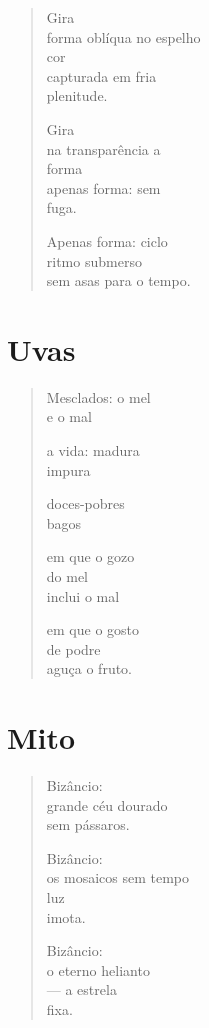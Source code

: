 \begin{verse}
Gira\\
forma oblíqua no espelho\\
cor\\
capturada em fria\\
plenitude.

Gira\\
na transparência a\\
\qquad\qquad\qquad\qquad forma\\
apenas forma: sem\\
\qquad\qquad\qquad\qquad fuga.

Apenas forma: ciclo\\
ritmo submerso\\
sem asas para o tempo.
\end{verse}

\chapter{Uvas}

\begin{verse}
Mesclados: o mel\\
\qquad\qquad\quad e o mal

a vida: madura\\
\qquad\quad impura

doces-pobres\\
bagos

em que o gozo\\
do mel\\
inclui o mal

em que o gosto\\
de podre\\
aguça o fruto.
\end{verse}

\chapter{Mito}

\begin{verse}
Bizâncio:\\
grande céu dourado\\
sem pássaros.

Bizâncio:\\
os mosaicos sem tempo\\
luz\\
imota.

Bizâncio:\\
o eterno helianto\\
--- a estrela\\
\quad fixa.
\end{verse}

